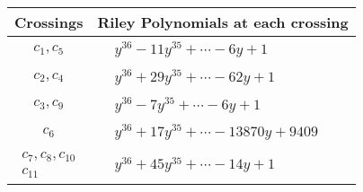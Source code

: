 \documentclass[1p]{elsarticle_modified}
\theoremstyle{definition}
\begin{document}
\begin{tabular}{m{50pt}|m{274pt}}
Crossings & \hspace{64pt}Riley Polynomials at each crossing \\
\hline $$\begin{aligned}c_{1},c_{5}\end{aligned}$$&$\begin{aligned}
&y^{36}-11 y^{35}+\cdots-6 y+1
\end{aligned}$\\
\hline $$\begin{aligned}c_{2},c_{4}\end{aligned}$$&$\begin{aligned}
&y^{36}+29 y^{35}+\cdots-62 y+1
\end{aligned}$\\
\hline $$\begin{aligned}c_{3},c_{9}\end{aligned}$$&$\begin{aligned}
&y^{36}-7 y^{35}+\cdots-6 y+1
\end{aligned}$\\
\hline $$\begin{aligned}c_{6}\end{aligned}$$&$\begin{aligned}
&y^{36}+17 y^{35}+\cdots-13870 y+9409
\end{aligned}$\\
\hline $$\begin{aligned}c_{7},c_{8},c_{10}\\c_{11}\end{aligned}$$&$\begin{aligned}
&y^{36}+45 y^{35}+\cdots-14 y+1
\end{aligned}$\\
\hline
\end{tabular}
\vskip 2pc
\end{document}
